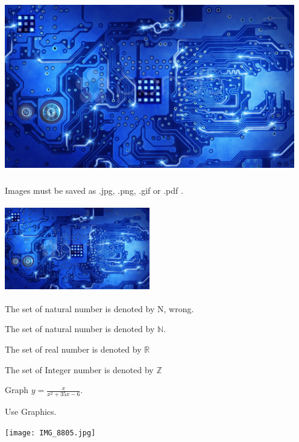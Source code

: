 \documentclass[10pt]{article}
\def\eq1{y = \frac{x}{x^2+35x-6}}
\begin{document}
\begin{center}
\includegraphics[width =5in, height = 3in]{wallpaper_2.jpg}

Images must be saved as .jpg, .png, .gif or .pdf .
\end{center}

\includegraphics[width =2.5in, height = 1.5in, angle = 45]{wallpaper_2.jpg}

The set of natural number is denoted by N, wrong.

The set of natural number is denoted by $ \mathbb{N}$.

The set of real number is denoted by $ \mathbb{R} $

The set of Integer number is denoted by $ \mathbb{Z} $

Graph $\eq1$.

Use Graphics.

\texttt{[image: IMG\_8805.jpg]}
 
\end{document}
